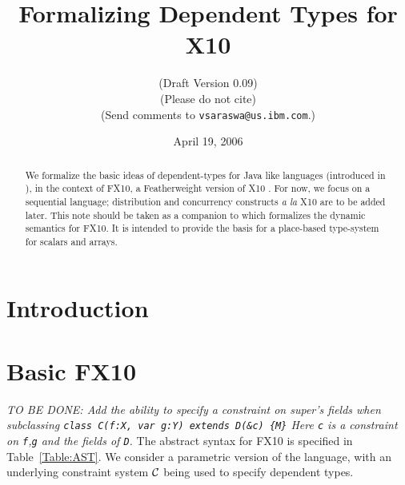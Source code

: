 \documentclass{article}
\def\Xten{{\sf X10}}
\def\FXten{{\sf FX10}}
\begin{document}
\title{Formalizing Dependent Types for \Xten}
\author{
({\sc Draft Version 0.09})\\
(Please do not cite)\\
(Send comments to {\tt vsaraswa@us.ibm.com}.)
}

\date{April 19, 2006}
\maketitle

\begin{abstract}
We formalize the basic ideas of dependent-types for Java like
languages (introduced in \cite{DependentTypes}), in the context of
\FXten, a Featherweight version of \Xten{} \cite{X10}.  For now, we
focus on a sequential language; distribution and concurrency
constructs {\em a la} \Xten{} are to be added later. This note should
be taken as a companion to \cite{X10-concur} which formalizes the
dynamic semantics for \FXten. It is intended to provide the basis for
a place-based type-system for scalars and arrays.
\end{abstract}

\section{Introduction}

\section{Basic \FXten}
{\em 
TO BE DONE: Add the ability to specify a constraint on super's fields
when subclassing
{\tt  class C(f:X, var g:Y) extends D(\&c) \{M\}}
Here {\tt c} is a constraint on {\tt f},{\tt g} and the fields of {\tt D}.
}
The abstract syntax for \FXten{} is specified in
Table~\ref{Table:AST}. We consider a parametric version of the
language, with an underlying constraint system $\cal C$ \cite{cccc} being used to
specify dependent types. 
\end{document}
